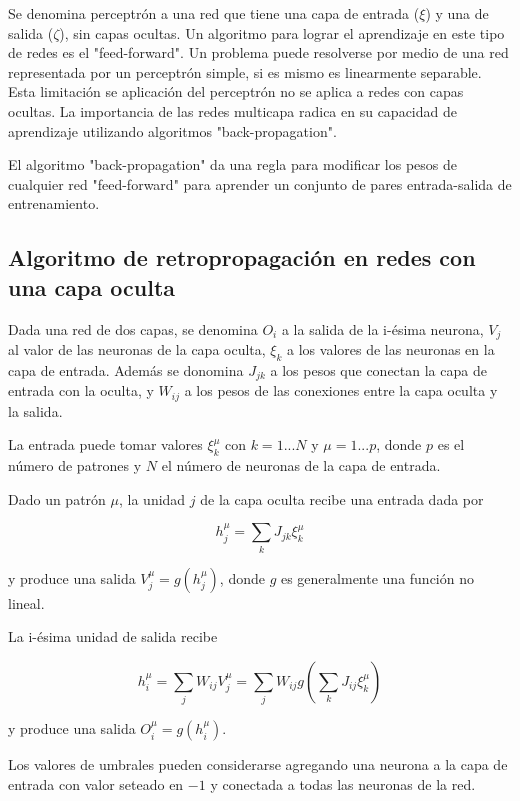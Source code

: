 \documentclass[aps,prb,onecolumn,10pt,floatfix,superscriptaddress]{article} %
\begin{document}
Se denomina perceptr\'on a una red que tiene una capa de entrada ($\xi$) y una de salida ($\zeta$), sin capas ocultas. Un algoritmo para lograr el aprendizaje en este tipo de redes es el "feed-forward". Un problema puede resolverse por medio de una red representada por un perceptr\'on simple, si es mismo es linearmente separable. Esta limitaci\'on se aplicaci\'on del perceptr\'on no se aplica a redes con capas ocultas. La importancia de las redes multicapa radica en su capacidad de aprendizaje utilizando algoritmos "back-propagation".

El algoritmo "back-propagation" da una regla para modificar los pesos de cualquier red "feed-forward" para aprender un conjunto de pares entrada-salida de entrenamiento.

\subsection{Algoritmo de retropropagaci\'on en redes con una capa oculta}

Dada una red de dos capas, se denomina $O_i$ a la salida de la i-\'esima neurona, $V_{j}$ al valor de las neuronas de la capa oculta, $\xi_{k}$ a los valores de las neuronas en la capa de entrada. Adem\'as se donomina $J_{jk}$ a los pesos que conectan la capa de entrada con la oculta, y $W_{ij}$ a los pesos de las conexiones entre la capa oculta y la salida.

La entrada puede tomar valores $\xi^{\mu}_{k}$ con $k=1...N$ y $\mu=1...p$, donde $p$ es el n\'umero de patrones y $N$ el n\'umero de neuronas de la capa de entrada.

Dado un patr\'on $\mu$, la unidad $j$ de la capa oculta recibe una entrada dada por 

\begin{equation}
h^{\mu}_{j} = \sum_{k} J_{jk} \xi^{\mu}_{k}
\end{equation}

y produce una salida $V^{\mu}_{j} = g(h^{\mu}_{j})$, donde $g$ es generalmente una funci\'on no lineal.

La i-\'esima unidad de salida recibe

\begin{equation}
h^{\mu}_{i} = \sum_{j} W_{ij} V^{\mu}_{j} = \sum_{j} W_{ij} g(\sum_{k} J_{ij} \xi^{\mu}_{k})
\end{equation}

y produce una salida $O^{\mu}_{i} = g(h^{\mu}_{i})$.

Los valores de umbrales pueden considerarse agregando una neurona a la capa de entrada con valor seteado en $-1$ y conectada a todas las neuronas de la red.
\end{document}
